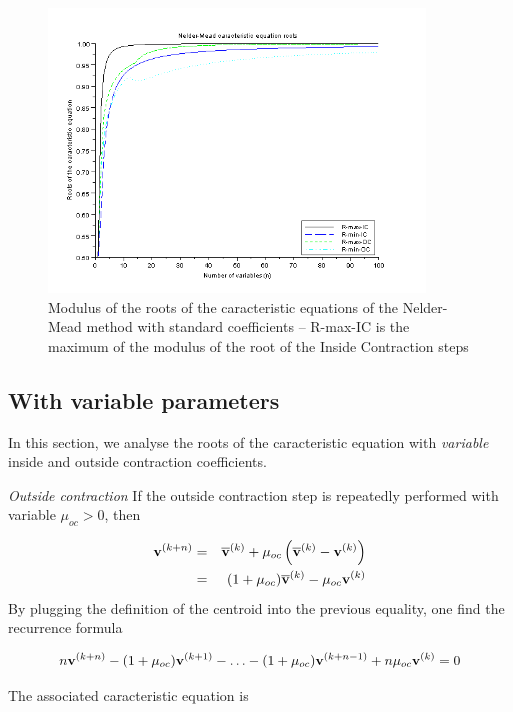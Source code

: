\begin{figure}
\begin{center}
\includegraphics[width=10cm]{neldermead-roots.png}
\end{center}
\caption{Modulus of the roots of the caracteristic equations of the Nelder-Mead method with standard 
coefficients -- R-max-IC is the maximum of the modulus of the root of the Inside Contraction steps}
\label{fig-nm-roots}
\end{figure}

\subsection{With variable parameters}

In this section, we analyse the roots of the caracteristic 
equation with \emph{variable} inside and outside contraction
coefficients.

\emph{Outside contraction} If the outside contraction step is repeatedly performed
with variable $\mu_{oc} > 0$, then 

\begin{eqnarray}
\mathbf{v}^{(k+n)} &=& \overline{\bold{v}}^{(k)} 
+ \mu_{oc} \left( \overline{\bold{v}}^{(k)} - \mathbf{v}^{(k)}\right) \\
&=& (1 + \mu_{oc} ) \overline{\bold{v}}^{(k)} - \mu_{oc} \mathbf{v}^{(k)}
\end{eqnarray}
By plugging the definition of the centroid into the previous equality, one 
find the recurrence formula

\begin{eqnarray}
n \mathbf{v}^{(k+n)} - (1 + \mu_{oc} ) \mathbf{v}^{(k+1)} - \ldots - (1 + \mu_{oc} ) \mathbf{v}^{(k+n-1)} + n\mu_{oc}\mathbf{v}^{(k)} = 0
\end{eqnarray}

The associated caracteristic equation is 

